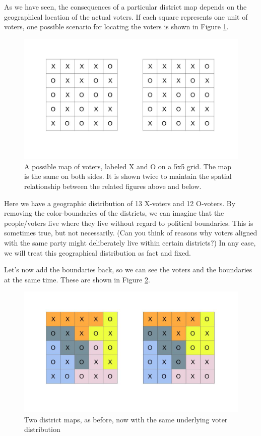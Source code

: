 \documentclass[
  openany]{book}
\begin{document}
As we have seen, the consequences of a particular district map depends on the geographical location of the actual voters. If each square represents one unit of voters, one possible scenario for locating the voters is shown in Figure \ref{fig:gerrymandering-5x5-2}.

\begin{figure}

{\centering \includegraphics[width=0.9\linewidth]{images/gerrymandering5x5_2}

}

\caption{A possible map of voters, labeled X and O on a 5x5 grid. The map is the same on both sides. It is shown twice to maintain the spatial relationship between the related figures above and below.}\label{fig:gerrymandering-5x5-2}
\end{figure}

Here we have a geographic distribution of 13 X-voters and 12 O-voters. By removing the color-boundaries of the districts, we can imagine that the people/voters live where they live without regard to political boundaries. This is sometimes true, but not necessarily. (Can you think of reasons why voters aligned with the same party might deliberately live within certain districts?) In any case, we will treat this geographical distribution as fact and fixed.

Let's now add the boundaries back, so we can see the voters and the boundaries at the same time. These are shown in Figure \ref{fig:gerrymandering-5x5-3}.

\begin{figure}

{\centering \includegraphics[width=0.9\linewidth]{images/gerrymandering5x5_3}

}

\caption{Two district maps, as before, now with the same underlying voter distribution}\label{fig:gerrymandering-5x5-3}
\end{figure}
\end{document}
